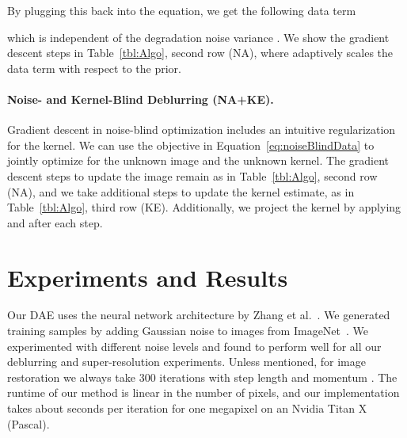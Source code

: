\documentclass{article}
\begin{document}
By plugging this back into the equation, we get the following data term

which is independent of the degradation noise variance .
We show the gradient descent steps in Table~\ref{tbl:Algo}, second row (NA), where  adaptively scales the data term with respect to the prior.

\paragraph{Noise- and Kernel-Blind Deblurring (NA+KE).}
Gradient descent in noise-blind optimization includes an intuitive regularization for the kernel.
We can use the objective in Equation~\eqref{eq:noiseBlindData} to jointly optimize for the unknown image and the unknown kernel.
The gradient descent steps to update the image remain as in Table~\ref{tbl:Algo}, second row (NA), and we take additional steps to update the kernel estimate, as in Table~\ref{tbl:Algo}, third row (KE).
Additionally, we project the kernel by applying  and  after each step.


\section{Experiments and Results}

Our DAE uses the neural network architecture by Zhang et al.~\cite{zhang2016beyond}.
We generated training samples by adding Gaussian noise to images from ImageNet~\cite{deng2009imagenet}.
We experimented with different noise levels and found  to perform well for all our deblurring and super-resolution experiments.
Unless mentioned, for image restoration we always take 300 iterations with step length  and momentum .
The runtime of our method is linear in the number of pixels, and our implementation takes about  seconds per iteration for one megapixel on an Nvidia Titan X (Pascal).
\end{document}
